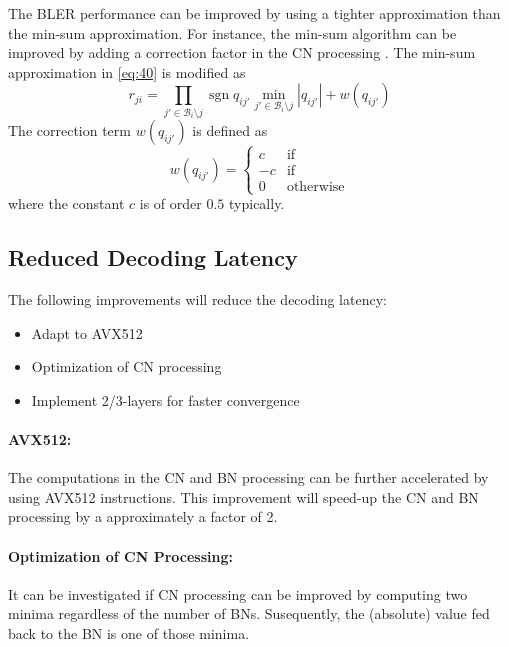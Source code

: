 \documentclass{article}
\def\Bcal{\mathcal{B}}
\newcommand{\sgn}{\operatorname{sgn}}
\begin{document}
The BLER performance can be improved by using a tighter approximation than the min-sum approximation. For instance, the min-sum algorithm can be improved by adding a correction factor in the CN processing . The min-sum approximation in \eqref{eq:40} is modified as
\begin{equation}
  \label{eq:50}
  r_{ji} = \prod_{j'\in\Bcal_i\setminus j}\sgn q_{ij'}\min_{j'\in\Bcal_i\setminus j} |q_{ij'}| + w(q_{ij'})
\end{equation}
The correction term $w(q_{ij'})$ is defined as
\begin{equation}
  \label{eq:51}
  w(q_{ij'}) =
  \begin{cases}
     c & \textrm{if}~  \\
    -c & \textrm{if}~ \\
     0 & \textrm{otherwise}
  \end{cases}
\end{equation}
where the constant $c$ is of order $0.5$ typically.

\subsection{Reduced Decoding Latency}
\label{sec:reduc-decod-latency}

The following improvements will reduce the decoding latency:

\begin{itemize}
\item Adapt to AVX512
\item Optimization of CN processing
\item Implement 2/3-layers for faster convergence
\end{itemize}

\paragraph{AVX512:}
The computations in the CN and BN processing can be further accelerated by using AVX512 instructions. This improvement will speed-up the CN and BN processing by a approximately a factor of 2.

\paragraph{Optimization of CN Processing:}
It can be investigated if CN processing can be improved by computing two minima regardless of the number of BNs. Susequently, the (absolute) value fed back to the BN is one of those minima.
\end{document}
